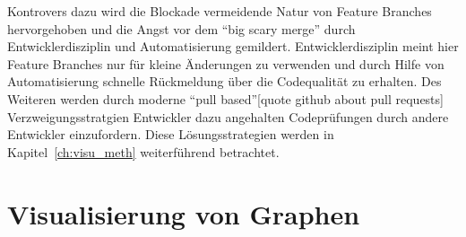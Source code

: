 Kontrovers dazu wird die Blockade vermeidende Natur von Feature Branches hervorgehoben und die Angst vor dem ``big scary merge'' durch Entwicklerdisziplin und Automatisierung gemildert. Entwicklerdisziplin meint hier Feature Branches nur für kleine Änderungen zu verwenden und durch Hilfe von Automatisierung schnelle Rückmeldung über die Codequalität zu erhalten. Des Weiteren werden durch moderne ``pull based''[quote github about pull requests] Verzweigungsstratgien Entwickler dazu angehalten Codeprüfungen durch andere Entwickler einzufordern. Diese Lösungsstrategien werden in Kapitel~\ref{ch:visu_meth} weiterführend betrachtet.

\section{Visualisierung von Graphen}